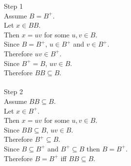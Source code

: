 \begin{enumerate}
          Step 1\\
          Assume $B = B^+$. \\
          Let $x \in BB$. \\
          Then $x = uv$ for some $u,v \in B$. \\
          Since $B = B^+$, $u \in B^+$ and $v \in B^+$. \\
          Therefore $uv \in B^+$. \\
          Since $B^+ = B$, $uv \in B$. \\
          Therefore $BB \subseteq B$. \\
          \\
          Step 2\\
          Assume $BB \subseteq B$. \\
          Let $x \in B^+$. \\
          Then $x = uv$ for some $u,v \in B$. \\
          Since $BB \subseteq B$, $uv \in B$. \\
          Therefore $B^+ \subseteq B$. \\
          Since $B \subseteq B^+$ and $B^+ \subseteq B$ then $B = B^+$. \\
          Therefore $B = B^+$ iff $BB \subseteq B$. \\


\end{enumerate}
